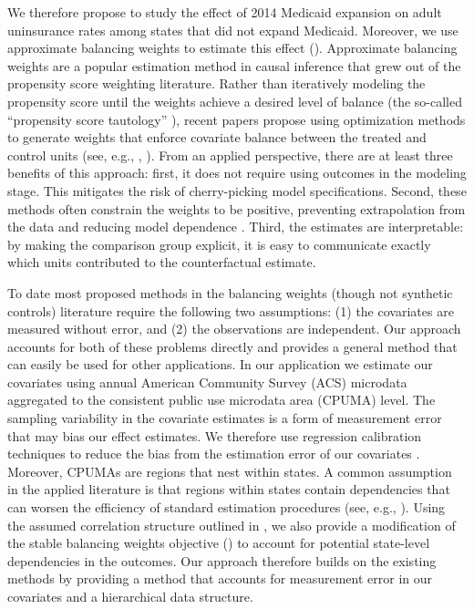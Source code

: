 We therefore propose to study the effect of 2014 Medicaid expansion on adult uninsurance rates among states that did not expand Medicaid. Moreover, we use approximate balancing weights to estimate this effect (\cite{wang2017minimal}). Approximate balancing weights are a popular estimation method in causal inference that grew out of the propensity score weighting literature. Rather than iteratively modeling the propensity score until the weights achieve a desired level of balance (the so-called ``propensity score tautology'' \cite{imai2014covariate}), recent papers propose using optimization methods to generate weights that enforce covariate balance between the treated and control units (see, e.g., \cite{imai2014covariate}, \cite{zubizarreta2015stable}). From an applied perspective, there are at least three benefits of this approach: first, it does not require using outcomes in the modeling stage. This mitigates the risk of cherry-picking model specifications. Second, these methods often constrain the weights to be positive, preventing extrapolation from the data and reducing model dependence \cite{zubizarreta2015stable}. Third, the estimates are interpretable: by making the comparison group explicit, it is easy to communicate exactly which units contributed to the counterfactual estimate.

To date most proposed methods in the balancing weights (though not synthetic controls) literature require the following two assumptions: (1) the covariates are measured without error, and (2) the observations are independent. Our approach accounts for both of these problems directly and provides a general method that can easily be used for other applications. In our application we estimate our covariates using annual American Community Survey (ACS) microdata aggregated to the consistent public use microdata area (CPUMA) level. The sampling variability in the covariate estimates is a form of measurement error that may bias our effect estimates. We therefore use regression calibration techniques to reduce the bias from the estimation error of our covariates \cite{gleser1992importance}. Moreover, CPUMAs are regions that nest within states. A common assumption in the applied literature is that regions within states contain dependencies that can worsen the efficiency of standard estimation procedures (see, e.g., \cite{cameron2015practitioner}). Using the assumed correlation structure outlined in \cite{kloek1981ols}, we also provide a modification of the stable balancing weights objective (\cite{zubizarreta2015stable}) to account for potential state-level dependencies in the outcomes. Our approach therefore builds on the existing methods by providing a method that accounts for measurement error in our covariates and a hierarchical data structure.

